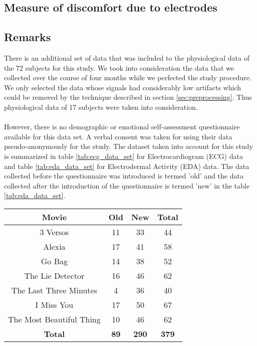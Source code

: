 \subsection{Measure of discomfort due to electrodes}

\subsection{Remarks}
There is an additional set of data that was included to the physiological data of the 72 subjects for this study. We took into consideration the data that we collected over the course of four months while we perfected the study procedure. We only selected the data whose signals had considerably low artifacts which could be removed by the technique described in section \ref{sec:preprocessing}. Thus physiological data of 17 subjects were taken into consideration. 
\paragraph{}However, there is no demographic or emotional self-assessment questionnaire available for this data set. A verbal consent was taken for using their data pseudo-anonymously for the study. The dataset taken into account for this study is summarized in table \ref{tab:ecg_data_set} for Electrocardiogram (ECG) data and table \ref{tab:eda_data_set} for Electrodermal Activity (EDA) data. The data collected before the questionnaire was introduced is termed 'old' and the data collected after the introduction of the questionnaire is termed 'new' in the table \ref{tab:eda_data_set}.


\begin{center}
\begin{tabular}{ |c|c|c|c| }
\hline
Movie & Old & New & Total \\
\hline
\hline
3 Versos & 11 & 33 & 44 \\
\hline
Alexia & 17 & 41 & 58 \\
\hline
Go Bag & 14 & 38 & 52 \\
\hline
The Lie Detector & 16 & 46 & 62 \\
\hline
The Last Three Minutes & 4 & 36 & 40 \\
\hline
I Miss You & 17 & 50 & 67 \\
\hline
The Most Beautiful Thing & 10 & 46 & 62 \\
\hline
\textbf{Total} & \textbf{89} & \textbf{290} & \textbf{379} \\
\hline
\end{tabular}
\label{tab:ecg_data_set}
\end{center}


